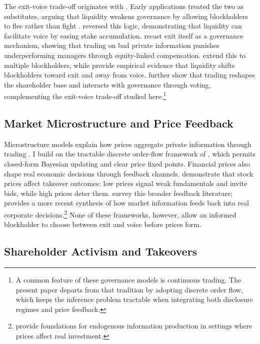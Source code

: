 \documentclass[11pt]{article}
\newcommand{\1}{\mathbf{1}}
\begin{document}
The exit-voice trade-off originates with \citet{Hirschman1970}. Early applications treated the two as substitutes, arguing that liquidity weakens governance by allowing blockholders to flee rather than fight \citep{Coffee1991,Bhide1993}. \citet{Maug1998} reversed this logic, demonstrating that liquidity can facilitate voice by easing stake accumulation. \citet{Edmans2009} recast exit itself as a governance mechanism, showing that trading on bad private information punishes underperforming managers through equity-linked compensation. \citet{EdmansManso2011} extend this to multiple blockholders, while \citet{EdmansFangZur2013} provide empirical evidence that liquidity shifts blockholders toward exit and away from voice. \citet{LevitMalenkoMaug2024} further show that trading reshapes the shareholder base and interacts with governance through voting, complementing the exit-voice trade-off studied here.\footnote{A common feature of these governance models is continuous trading. The present paper departs from that tradition by adopting discrete order flow, which keeps the inference problem tractable when integrating both disclosure regimes and price feedback.}

%
\subsection{Market Microstructure and Price Feedback}
%

Microstructure models explain how prices aggregate private information through trading \citep{Kyle1985,GlostenMilgrom1985}. I build on the tractable discrete order-flow framework of \citet{EdmansGoldsteinJiang2015}, which permits closed-form Bayesian updating and clear price fixed points. Financial prices also shape real economic decisions through feedback channels. \citet{EdmansGoldsteinJiang2012} demonstrate that stock prices affect takeover outcomes: low prices signal weak fundamentals and invite bids, while high prices deter them. \citet{BondEdmansGoldstein2012} survey this broader feedback literature; \citet{Goldstein2023} provides a more recent synthesis of how market information feeds back into real corporate decisions.\footnote{\citet{DowGoldsteinGuembel2017} provide foundations for endogenous information production in settings where prices affect real investment.} None of these frameworks, however, allow an informed blockholder to choose between exit and voice before prices form.

%
\subsection{Shareholder Activism and Takeovers}
%
\end{document}
